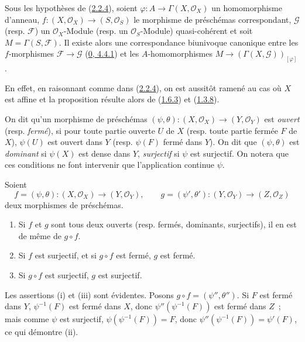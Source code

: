 \begin{proposition}[2.2.5]
\label{I.2.2.5-fr}
Sous les hypothèses de (\hyperref[I.2.2.4-fr]{2.2.4}), soient
$\varphi:A\to\Gamma(X,\mathscr{O}_X)$ un homomorphisme d'anneau,
$f:(X,\mathscr{O}_X)\to(S,\mathscr{O}_S)$ le morphisme de préschémas
correspondant, $\mathscr{G}$ (resp. $\mathscr{F}$) un
$\mathscr{O}_X$-Module (resp. un $\mathscr{O}_S$-Module) quasi-cohérent et
soit $M=\Gamma(S,\mathscr{F})$. Il existe alors une
correspondance biunivoque canonique entre les $f$-morphismes
$\mathscr{F}\to\mathscr{G}$ (\hyperref[0.4.4.1-fr]{0, 4.4.1}) et les
$A$-homomorphismes
$M\to(\Gamma(X,\mathscr{G}))_{[\varphi]}$.
\end{proposition}

En effet, en raisonnant comme dans (\hyperref[I.2.2.4-fr]{2.2.4}), on est
aussitôt ramené au cas où $X$ est affine et la proposition résulte alors de
(\hyperref[I.1.6.3-fr]{1.6.3}) et (\hyperref[I.1.3.8-fr]{1.3.8}).

\begin{env}[2.2.6]
\label{I.2.2.6-fr}
On dit qu'un morphisme de préschémas
$(\psi,\theta):(X,\mathscr{O}_X)\to(Y,\mathscr{O}_Y)$ est \emph{ouvert}
(resp. \emph{fermé}), si pour toute partie ouverte $U$ de $X$ (resp. toute
partie fermée $F$ de $X$), $\psi(U)$ est ouvert dans $Y$ (resp. $\psi(F)$
fermé dans $Y$). On dit que $(\psi,\theta)$ est \emph{dominant} si $\psi(X)$
est dense dans $Y$, \emph{surjectif} si $\psi$ est surjectif. On notera que
ces conditions ne font intervenir que l'application continue $\psi$.
\end{env}

\begin{proposition}[2.2.7]
\label{I.2.2.7-fr}
Soient
\[
  f=(\psi,\theta):(X,\mathscr{O}_X)\to(Y,\mathscr{O}_Y),
  \qquad
  g=(\psi',\theta'):(Y,\mathscr{O}_Y)\to(Z,\mathscr{O}_Z)
\]
deux morphismes de préschémas.
\begin{enumerate}
  \item[\rm(i)] Si $f$ et $g$ sont tous deux ouverts (resp. fermés, dominants,
    surjectifs), il en est de même de $g\circ f$.
  \item[\rm(ii)] Si $f$ est surjectif, et si $g\circ f$ est fermé, $g$ est
    fermé.
  \item[\rm(iii)] Si $g\circ f$ est surjectif, $g$ est surjectif.
\end{enumerate}
\end{proposition}

Les assertions (i) et (iii) sont évidentes. Posons
$g\circ f=(\psi'',\theta'')$. Si $F$ est fermé dans $Y$,
$\psi^{-1}(F)$ est fermé dans $X$, donc
$\psi''(\psi^{-1}(F))$ est fermé dans $Z$~; mais comme $\psi$ est surjectif,
$\psi(\psi^{-1}(F))=F$, donc
$\psi''(\psi^{-1}(F))=\psi'(F)$, ce qui démontre (ii).

